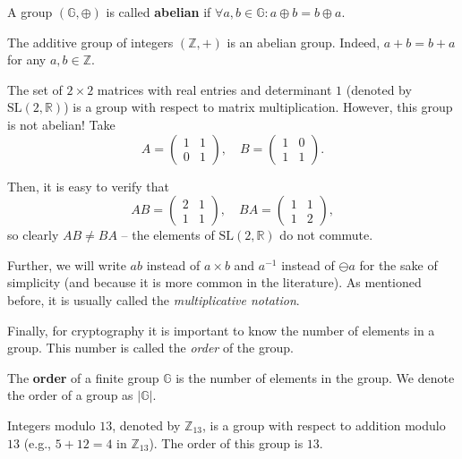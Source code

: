 \documentclass[../lecture-notes.tex]{subfiles}
\begin{document}
\begin{definition}
    A group $(\mathbb{G},\oplus)$ is called \textbf{abelian} if $\forall a,b \in \mathbb{G}: a \oplus b = b \oplus a$.
\end{definition}

\begin{example}
    The additive group of integers $(\mathbb{Z},+)$ is an abelian group. Indeed, $a + b = b + a$ for any $a,b \in \mathbb{Z}$.
\end{example}

\begin{example}
    The set of $2 \times 2$ matrices with real entries and determinant $1$ (denoted by $\text{SL}(2,\mathbb{R})$) is a group with respect to matrix multiplication. However, this group is not abelian! Take
    \begin{equation}
        A = \begin{pmatrix}
            1 & 1 \\
            0 & 1
        \end{pmatrix}, \quad B = \begin{pmatrix}
            1 & 0 \\
            1 & 1
        \end{pmatrix}.
    \end{equation}

    Then, it is easy to verify that
    \begin{equation}
        AB = \begin{pmatrix}
            2 & 1 \\
            1 & 1
        \end{pmatrix}, \quad BA = \begin{pmatrix}
            1 & 1 \\
            1 & 2
        \end{pmatrix},
    \end{equation}
    so clearly $AB \neq BA$ -- the elements of $\text{SL}(2, \mathbb{R})$ do not commute.
\end{example}

\begin{remark}
    Further, we will write $ab$ instead of $a \times b$ and $a^{-1}$ instead of $\ominus a$ for the sake of simplicity (and because it is more common in the literature). As mentioned before, it is usually called the \textit{multiplicative notation}.
\end{remark}

Finally, for cryptography it is important to know the number of elements in a group. This number is called the \textit{order} of the group.
\begin{definition}
    The \textbf{order} of a finite group $\mathbb{G}$ is the number of elements in the group. We denote the order of a group as $|\mathbb{G}|$.
\end{definition}
\begin{example}
    Integers modulo $13$, denoted by $\mathbb{Z}_{13}$, is a group with respect to addition modulo $13$ (e.g., $5+12=4$ in $\mathbb{Z}_{13}$). The order of this group is $13$.
\end{example}
\end{document}
